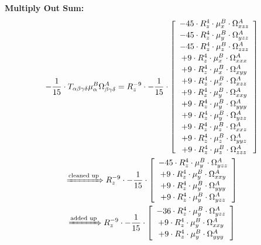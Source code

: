 \documentclass{article}
\begin{document}
\textbf{Multiply Out Sum:}
\begin{subequations}\begin{gather}
- \frac{1}{15} \cdot T_{\alpha{}\beta{}\gamma{}\delta{}} \mu{}^{B}_{\alpha{}} \Omega{}^{A}_{\beta{}\gamma{}\delta{}} = R_{z}^{-9} \cdot - \frac{1}{15} \cdot  \left[ \begin{array}{c} 
 		- 45 \cdot R_{z}^{4} \cdot \mu{}^{B}_{x} \cdot \Omega{}^{A}_{xzz} 
 \\[0.2em] 		 - 45 \cdot R_{z}^{4} \cdot \mu{}^{B}_{y} \cdot \Omega{}^{A}_{yzz} 
 \\[0.2em] 		 - 45 \cdot R_{z}^{4} \cdot \mu{}^{B}_{z} \cdot \Omega{}^{A}_{zzz} 
 \\[0.2em] 		 + 9 \cdot R_{z}^{4} \cdot \mu{}^{B}_{x} \cdot \Omega{}^{A}_{xxx} 
 \\[0.2em] 		 + 9 \cdot R_{z}^{4} \cdot \mu{}^{B}_{x} \cdot \Omega{}^{A}_{xyy} 
 \\[0.2em] 		 + 9 \cdot R_{z}^{4} \cdot \mu{}^{B}_{x} \cdot \Omega{}^{A}_{xzz} 
 \\[0.2em] 		 + 9 \cdot R_{z}^{4} \cdot \mu{}^{B}_{y} \cdot \Omega{}^{A}_{xxy} 
 \\[0.2em] 		 + 9 \cdot R_{z}^{4} \cdot \mu{}^{B}_{y} \cdot \Omega{}^{A}_{yyy} 
 \\[0.2em] 		 + 9 \cdot R_{z}^{4} \cdot \mu{}^{B}_{y} \cdot \Omega{}^{A}_{yzz} 
 \\[0.2em] 		 + 9 \cdot R_{z}^{4} \cdot \mu{}^{B}_{z} \cdot \Omega{}^{A}_{xxz} 
 \\[0.2em] 		 + 9 \cdot R_{z}^{4} \cdot \mu{}^{B}_{z} \cdot \Omega{}^{A}_{yyz} 
 \\[0.2em] 		 + 9 \cdot R_{z}^{4} \cdot \mu{}^{B}_{z} \cdot \Omega{}^{A}_{zzz}
 \end{array}\right] 
\\ \xRightarrow{\text{cleaned up}}
 R_{z}^{-9} \cdot - \frac{1}{15} \cdot  \left[ \begin{array}{c} 
 		- 45 \cdot R_{z}^{4} \cdot \mu{}^{B}_{y} \cdot \Omega{}^{A}_{yzz} 
 \\[0.2em] 		 + 9 \cdot R_{z}^{4} \cdot \mu{}^{B}_{y} \cdot \Omega{}^{A}_{xxy} 
 \\[0.2em] 		 + 9 \cdot R_{z}^{4} \cdot \mu{}^{B}_{y} \cdot \Omega{}^{A}_{yyy} 
 \\[0.2em] 		 + 9 \cdot R_{z}^{4} \cdot \mu{}^{B}_{y} \cdot \Omega{}^{A}_{yzz}
 \end{array}\right] 
\\ \xRightarrow{\text{added up}}
 R_{z}^{-9} \cdot - \frac{1}{15} \cdot  \left[ \begin{array}{c} 
 		- 36 \cdot R_{z}^{4} \cdot \mu{}^{B}_{y} \cdot \Omega{}^{A}_{yzz} 
 \\[0.2em] 		 + 9 \cdot R_{z}^{4} \cdot \mu{}^{B}_{y} \cdot \Omega{}^{A}_{xxy} 
 \\[0.2em] 		 + 9 \cdot R_{z}^{4} \cdot \mu{}^{B}_{y} \cdot \Omega{}^{A}_{yyy}
 \end{array}\right] 
\end{gather}\end{subequations}
\end{document}
